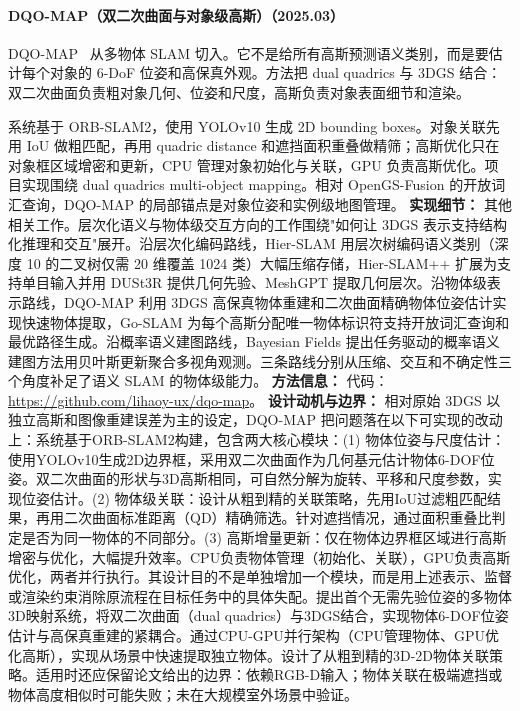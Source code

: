 \paragraph{DQO-MAP（双二次曲面与对象级高斯）（2025.03）}
DQO-MAP~\cite{2503_02223} 从多物体 SLAM 切入。它不是给所有高斯预测语义类别，而是要估计每个对象的 6-DoF 位姿和高保真外观。方法把 dual quadrics 与 3DGS 结合：双二次曲面负责粗对象几何、位姿和尺度，高斯负责对象表面细节和渲染。

系统基于 ORB-SLAM2，使用 YOLOv10 生成 2D bounding boxes。对象关联先用 IoU 做粗匹配，再用 quadric distance 和遮挡面积重叠做精筛；高斯优化只在对象框区域增密和更新，CPU 管理对象初始化与关联，GPU 负责高斯优化。项目实现围绕 dual quadrics multi-object mapping。相对 OpenGS-Fusion 的开放词汇查询，DQO-MAP 的局部锚点是对象位姿和实例级地图管理。
\textbf{实现细节：} 其他相关工作。层次化语义与物体级交互方向的工作围绕"如何让 3DGS 表示支持结构化推理和交互"展开。沿层次化编码路线，Hier-SLAM 用层次树编码语义类别（深度 10 的二叉树仅需 20 维覆盖 1024 类）大幅压缩存储，Hier-SLAM++ 扩展为支持单目输入并用 DUSt3R 提供几何先验、MeshGPT 提取几何层次。沿物体级表示路线，DQO-MAP 利用 3DGS 高保真物体重建和二次曲面精确物体位姿估计实现快速物体提取，Go-SLAM 为每个高斯分配唯一物体标识符支持开放词汇查询和最优路径生成。沿概率语义建图路线，Bayesian Fields 提出任务驱动的概率语义建图方法用贝叶斯更新聚合多视角观测。三条路线分别从压缩、交互和不确定性三个角度补足了语义 SLAM 的物体级能力。
\textbf{方法信息：} 代码：\url{https://github.com/lihaoy-ux/dqo-map}。
\textbf{设计动机与边界：} 相对原始 3DGS 以独立高斯和图像重建误差为主的设定，DQO-MAP 把问题落在以下可实现的改动上：系统基于ORB-SLAM2构建，包含两大核心模块：(1) 物体位姿与尺度估计：使用YOLOv10生成2D边界框，采用双二次曲面作为几何基元估计物体6-DOF位姿。双二次曲面的形状与3D高斯相同，可自然分解为旋转、平移和尺度参数，实现位姿估计。(2) 物体级关联：设计从粗到精的关联策略，先用IoU过滤粗匹配结果，再用二次曲面标准距离（QD）精确筛选。针对遮挡情况，通过面积重叠比判定是否为同一物体的不同部分。(3) 高斯增量更新：仅在物体边界框区域进行高斯增密与优化，大幅提升效率。CPU负责物体管理（初始化、关联），GPU负责高斯优化，两者并行执行。其设计目的不是单独增加一个模块，而是用上述表示、监督或渲染约束消除原流程在目标任务中的具体失配。提出首个无需先验位姿的多物体3D映射系统，将双二次曲面（dual quadrics）与3DGS结合，实现物体6-DOF位姿估计与高保真重建的紧耦合。通过CPU-GPU并行架构（CPU管理物体、GPU优化高斯），实现从场景中快速提取独立物体。设计了从粗到精的3D-2D物体关联策略。适用时还应保留论文给出的边界：依赖RGB-D输入；物体关联在极端遮挡或物体高度相似时可能失败；未在大规模室外场景中验证。
